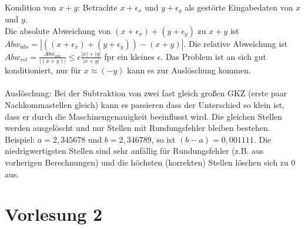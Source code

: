 \documentclass[]{article}
\begin{document}
\begin{enumerate}
	\\
		Kondition von $x+y$: Betrachte $x+\epsilon_x$ und $y+\epsilon_y$ als gestörte Eingabedaten von $x$ und $y$. \\
		Die absolute Abweichung von $(x+\epsilon_x) + (y+\epsilon_y)$ zu $x+y$ ist $Abw_{abs} = |((x+\epsilon_x) + (y+\epsilon_y)) - (x+y)|$. Die relative Abweichung ist $Abw_{rel} = \frac{Abw_{abs}}{|(x+y)|} \leq \epsilon \frac{|x|+|y|}{|x+y|}$ fpr ein kleines $\epsilon$. Das Problem ist an sich gut konditioniert, nur für $x \approx (-y)$ kann es zur Auslöschung kommen.\\
	\\
		Auslöschung: Bei der Subtraktion von zwei fast gleich großen GKZ (erste paar Nachkommastellen gleich) kann es
		passieren dass der Unterschied so klein ist, dass er durch die Maschinengenauigkeit beeinflusst wird. Die gleichen Stellen werden ausgelöscht und nur Stellen mit Rundungsfehler bleiben bestehen.\\
	Beispiel: $a = 2,345678$ und $b = 2,346789$, so ist $(b-a) = 0,001111$. Die niedrigwertigsten Stellen sind sehr anfällig für Rundungsfehler (z.B. aus vorherigen Berechnungen) und die höchsten (korrekten) Stellen löschen sich zu $0$ aus.
\end{enumerate}

\section{Vorlesung 2}
\end{document}
